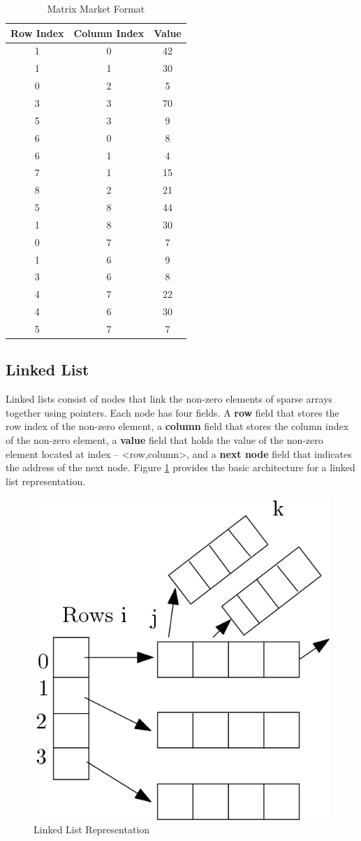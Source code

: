  \begin{table}[H]
	\caption{Matrix Market Format\label{tab:matrixmarket}}
	\begin{center}
		\begin{tabular}{ccc}
			\hline
			{\textbf{Row Index}} & {\textbf{Column Index}} & {\textbf{Value}}\\
			\hline
			1 & 0 & 42 \\
			1 & 1 & 30\\
			0 & 2 & 5\\
			3 & 3 & 70\\
			5 & 3 & 9\\
			6 & 0 & 8 \\
			6 & 1 & 4 \\
			7 & 1 & 15 \\
			8 & 2 & 21 \\
			5 & 8 & 44\\
			1 & 8 & 30\\
			0 & 7 & 7\\
			1 & 6 & 9\\
			3 & 6 & 8\\
			4 & 7 & 22\\
			4 & 6 & 30\\
			5 & 7 & 7 \\
			\hline
		\end{tabular}
	\end{center}
\end{table}

\subsection{Linked List}
Linked lists  consist of nodes that link the non-zero elements of sparse arrays together using pointers. Each node has four fields. A \textbf{row} field that stores the row index of the non-zero element, a \textbf{column} field that stores the column index of the non-zero element, a \textbf{value} field that holds the value of the non-zero element located at index – <row,column>, and a \textbf{next node} field that indicates the address of the next node. Figure \ref{fig:linkedList} provides the basic architecture for a linked list representation.

 \begin{figure}[H]
	\centering
	\includegraphics[width=0.3\linewidth]{LinkedList}
	\caption{Linked List Representation}
	\label{fig:linkedList}
\end{figure}

